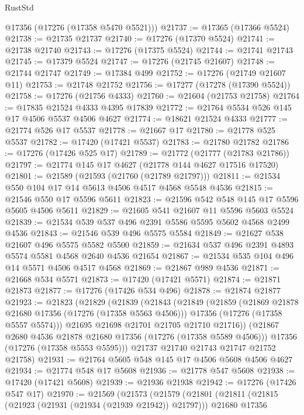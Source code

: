 \begin{lexlean}{RustStd}
\begin{coremodule}
      @17356
      (@17276 (@17358 @5470 @5521)))
@21737 := @17365 (@17366 @5524)
@21738 := @21735 @21737
@21740 := @17276 (@17370 @5524)
@21741 := @21738 @21740
@21743 := @17276 (@17375 @5524)
@21744 := @21741 @21743
@21745 := @17379 @5524
@21747 := @17276 (@21745 @21607)
@21748 := @21744 @21747
@21749 := @17384 @499
@21752 := @17276 (@21749 @21607 @11)
@21753 := @21748 @21752
@21756 := @17277 (@17278 (@17390 @5524))
@21758 := @17276 (@21756 @4333)
@21760 := @21604 (@21753 @21758)
@21764 := @17835 @21524 @4333 @4395 @17839
@21772 := @21764 @5534 @526 @145 @17 @4506 @5537 @4506 @4627
@21774 := @18621 @21524 @4333
@21777 := @21774 @526 @17 @5537
@21778 := @21667 @17
@21780 := @21778 @525 @5537
@21782 := @17420 (@17421 @5537)
@21783 := @21780 @21782
@21786 := @17276 (@17426 @525 @17)
@21789 := @21772 (@21777 (@21783 @21786))
@21797 := @21774 @145 @17 @4627 (@21778 @144 @4627 @17516 @17520)
@21801 := @21589 (@21593 (@21760 (@21789 @21797)))
@21811 := @21534 @550 @104 @17 @14 @5613 @4506 @4517 @4568 @5548 @4536
@21815 := @21546 @550 @17 @5596 @5611
@21823 := @21596 @542 @548 @145 @17 @5596 @5605 @4506 @5611
@21829 := @21605 @541 @21607 @11 @5596 @5603 @5524
@21839 := @21534 @539 @537 @496 @2391 @5586 @5595 @5602 @4568 @2499 @4536
@21843 := @21546 @539 @496 @5575 @5584
@21849 := @21627 @538 @21607 @496 @5575 @5582 @5500
@21859 := @21634 @537 @496 @2391 @4893 @5574 @5581 @4568 @2640 @4536 @21654
@21867 := @21534 @535 @104 @496 @14 @5571 @4506 @4517 @4568
@21869 := @21867 @989 @4536
@21871 := @21668 @534 @5571
@21873 := @17420 (@17421 @5571)
@21874 := @21871 @21873
@21877 := @17276 (@17426 @534 @496)
@21878 := @21874 @21877
@21923 := @21823
    (@21829
      (@21839
        (@21843
          (@21849
            (@21859
              (@21869 @21878 @21680 @17356 (@17276 (@17358 @5563 @4506)))
              @17356
              (@17276 (@17358 @5557 @5574)))
            @21695
            @21698
            @21701
            @21705
            @21710
            @21716))
        (@21867 @2680 @4536 @21878 @21680 @17356 (@17276 (@17358 @5589 @4506)))
        @17356
        (@17276 (@17358 @5553 @5595)))
      @21737
      @21740
      @21743
      @21747
      @21752
      @21758)
@21931 := @21764 @5605 @548 @145 @17 @4506 @5608 @4506 @4627
@21934 := @21774 @548 @17 @5608
@21936 := @21778 @547 @5608
@21938 := @17420 (@17421 @5608)
@21939 := @21936 @21938
@21942 := @17276 (@17426 @547 @17)
@21970 := @21569
    (@21573
      (@21579
        (@21801
          (@21811
            (@21815 (@21923 (@21931 (@21934 (@21939 @21942)) @21797)))
            @21680
            @17356

\end{coremodule}
\end{lexlean}
